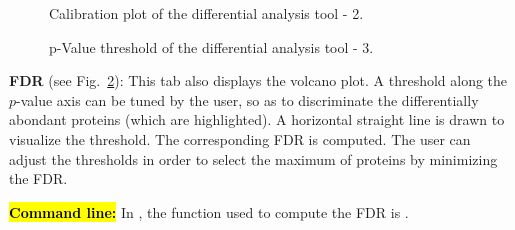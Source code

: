 \documentclass[12pt]{article}
\begin{document}
\begin {figure}
\centering
{}
\caption{Calibration plot of the differential analysis tool - 2.}\label{fig:anadiff2}
\end {figure}


\begin {figure}
\centering
{}
\caption{p-Value threshold of the differential analysis tool - 3.}\label{fig:anadiff3}
\end {figure}

\textbf{FDR} (see Fig.~\ref{fig:anadiff3}): This tab also displays the volcano plot. A threshold along the $p$-value axis can be tuned by the user, so as to discriminate the differentially abondant proteins (which are highlighted). A horizontal straight line is drawn to visualize the threshold. The corresponding FDR is computed. The user can adjust the thresholds in order to select the maximum of proteins by minimizing the FDR.


\hl{\bf Command line:} In , the function used to compute the FDR is .
\end{document}
